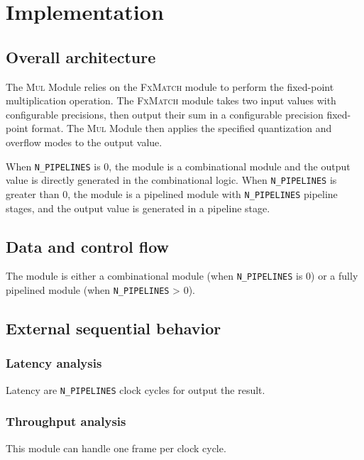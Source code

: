 \documentclass[a4paper, oneside]{report}
\begin{document}
        

    \chapter{Implementation}
        \section{Overall architecture}
                The \textsc{Mul} Module relies on the \textsc{FxMatch} module to perform the fixed-point multiplication operation. The \textsc{FxMatch} module takes two input values with configurable precisions, then output their sum in a configurable precision fixed-point format. The \textsc{Mul} Module then applies the specified quantization and overflow modes to the output value.

                When \texttt{N\_PIPELINES} is 0, the module is a combinational module and the output value is directly generated in the combinational logic. When \texttt{N\_PIPELINES} is greater than 0, the module is a pipelined module with \texttt{N\_PIPELINES} pipeline stages, and the output value is generated in a pipeline stage.
                
        \section{Data and control flow}
            The module is either a combinational module (when \texttt{N\_PIPELINES} is 0) or a fully pipelined module (when \texttt{N\_PIPELINES} > 0). 
            \section{External sequential behavior}
            \subsection{Latency analysis}
                Latency are \texttt{N\_PIPELINES} clock cycles for output the result.
            \subsection{Throughput analysis}
                This module can handle one frame per clock cycle.


\end{document}
